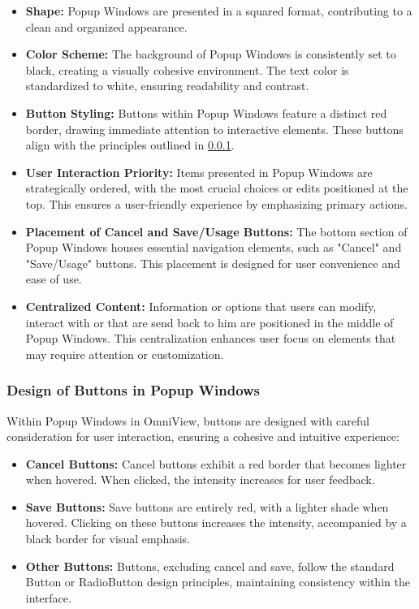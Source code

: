 \documentclass[]{scrreprt}
\begin{document}
\begin{itemize}
    \item \textbf{Shape:} Popup Windows are presented in a squared format, contributing to a clean and organized appearance.
    
    \item \textbf{Color Scheme:} The background of Popup Windows is consistently set to black, creating a visually cohesive environment. The text color is standardized to white, ensuring readability and contrast.
    
    \item \textbf{Button Styling:} Buttons within Popup Windows feature a distinct red border, drawing immediate attention to interactive elements. These buttons align with the principles outlined in \ref{cap:Designprinciples_PopupWindowButtons}.
    
    \item \textbf{User Interaction Priority:} Items presented in Popup Windows are strategically ordered, with the most crucial choices or edits positioned at the top. This ensures a user-friendly experience by emphasizing primary actions.
    
    \item \textbf{Placement of Cancel and Save/Usage Buttons:} The bottom section of Popup Windows houses essential navigation elements, such as "Cancel" and "Save/Usage" buttons. This placement is designed for user convenience and ease of use.
    
    \item \textbf{Centralized Content:} Information or options that users can modify, interact with or that are send back to him are positioned in the middle of Popup Windows. This centralization enhances user focus on elements that may require attention or customization.
\end{itemize}

\subsubsection{Design of Buttons in Popup Windows}\label{cap:Designprinciples_PopupWindowButtons}

Within Popup Windows in OmniView, buttons are designed with careful consideration for user interaction, ensuring a cohesive and intuitive experience:

\begin{itemize}
    \item \textbf{Cancel Buttons:} Cancel buttons exhibit a red border that becomes lighter when hovered. When clicked, the intensity increases for user feedback.
    
    \item \textbf{Save Buttons:} Save buttons are entirely red, with a lighter shade when hovered. Clicking on these buttons increases the intensity, accompanied by a black border for visual emphasis.
    
    \item \textbf{Other Buttons:} Buttons, excluding cancel and save, follow the standard Button or RadioButton design principles, maintaining consistency within the interface.
\end{itemize}
\end{document}
